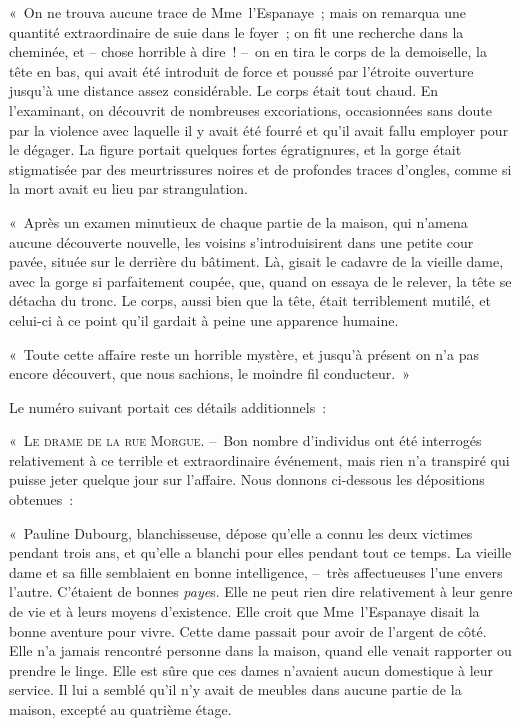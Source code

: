 \documentclass[french,twoside]{book} %
\begin{document}
« On ne trouva aucune trace de Mme l’Espanaye ; mais on remarqua une quantité extraordinaire de suie dans le foyer ; on fit une recherche dans la cheminée, et – chose horrible à dire ! – on en tira le corps de la demoiselle, la tête en bas, qui avait été introduit de force et poussé par l’étroite ouverture jusqu’à une distance assez considérable. Le corps était tout chaud. En l’examinant, on découvrit de nombreuses excoriations, occasionnées sans doute par la violence avec laquelle il y avait été fourré et qu’il avait fallu employer pour le dégager. La figure portait quelques fortes égratignures, et la gorge était stigmatisée par des meurtrissures noires et de profondes traces d’ongles, comme si la mort avait eu lieu par strangulation.\par
« Après un examen minutieux de chaque partie de la maison, qui n’amena aucune découverte nouvelle, les voisins s’introduisirent dans une petite cour pavée, située sur le derrière du bâtiment. Là, gisait le cadavre de la vieille dame, avec la gorge si parfaitement coupée, que, quand on essaya de le relever, la tête se détacha du tronc. Le corps, aussi bien que la tête, était terriblement mutilé, et celui-ci à ce point qu’il gardait à peine une apparence humaine.\par
« Toute cette affaire reste un horrible mystère, et jusqu’à présent on n’a pas encore découvert, que nous sachions, le moindre fil conducteur. »\par
Le numéro suivant portait ces détails additionnels :\par
« {\scshape Le drame de la rue Morgue}. – Bon nombre d’individus ont été interrogés relativement à ce terrible et extraordinaire événement, mais rien n’a transpiré qui puisse jeter quelque jour sur l’affaire. Nous donnons ci-dessous les dépositions obtenues :\par
« Pauline Dubourg, blanchisseuse, dépose qu’elle a connu les deux victimes pendant trois ans, et qu’elle a blanchi pour elles pendant tout ce temps. La vieille dame et sa fille semblaient en bonne intelligence, – très affectueuses l’une envers l’autre. C’étaient de bonnes \emph{paye}s. Elle ne peut rien dire relativement à leur genre de vie et à leurs moyens d’existence. Elle croit que Mme l’Espanaye disait la bonne aventure pour vivre. Cette dame passait pour avoir de l’argent de côté. Elle n’a jamais rencontré personne dans la maison, quand elle venait rapporter ou prendre le linge. Elle est sûre que ces dames n’avaient aucun domestique à leur service. Il lui a semblé qu’il n’y avait de meubles dans aucune partie de la maison, excepté au quatrième étage.\par
\end{document}
